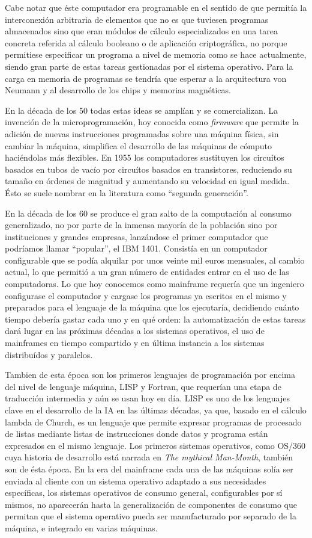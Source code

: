 \documentclass[12pt]{memoir}
\begin{document}
Cabe notar que éste computador era programable en el sentido de que permitía la interconexión arbitraria de elementos que no es que tuviesen programas almacenados sino que eran módulos de cálculo especializados en una tarea concreta referida al cálculo booleano o de aplicación criptográfica, no porque permitiese especificar un programa a nivel de memoria como se hace actualmente, siendo gran parte de estas tareas gestionadas por el sistema operativo. Para la carga en memoria de programas se tendría que esperar a la arquitectura von Neumann y al desarrollo de los chips y memorias magnéticas.

En la década de los 50 todas estas ideas se amplían y se comercializan. La invención de la microprogramación, hoy conocida como \textit{firmware} que permite la adición de nuevas instrucciones programadas sobre una máquina física, sin cambiar la máquina, simplifica el desarrollo de las máquinas de cómputo haciéndolas más flexibles. En 1955 los computadores sustituyen los circuítos basados en tubos de vacío por circuítos basados en transistores, reduciendo su tamaño en órdenes de magnitud y aumentando su velocidad en igual medida. Ésto se suele nombrar en la literatura como ``segunda generación''.

En la década de los 60 se produce el gran salto de la computación al consumo generalizado, no por parte de la inmensa mayoría de la población sino por instituciones y grandes empresas, lanzándose el primer computador que podríamos llamar ``popular'', el IBM 1401. Consistía en un computador configurable que se podía alquilar por unos veinte mil euros mensuales, al cambio actual, lo que permitió a un gran número de entidades entrar en el uso de las computadoras. Lo que hoy conocemos como mainframe requería que un ingeniero configurase el computador y cargase los programas ya escritos en el mismo y preparados para el lenguaje de la máquina que los ejecutaría, decidiendo cuánto tiempo debería gastar cada uno y en qué orden: la automatización de estas tareas dará lugar en las próximas décadas a los sistemas operativos, el uso de mainframes en tiempo compartido y en última instancia a los sistemas distribuídos y paralelos. 

Tambien de esta época son los primeros lenguajes de programación por encima del nivel de lenguaje máquina, LISP y Fortran, que requerían una etapa de traducción intermedia y aún se usan hoy en día. LISP es uno de los lenguajes clave en el desarrollo de la IA en las últimas décadas, ya que, basado en el cálculo lambda de Church, es un lenguaje que permite expresar programas de procesado de listas mediante listas de instrucciones donde datos y programa están expresados en el mismo lenguaje. Los primeros sistemas operativos, como OS/360 cuya historia de desarrollo está narrada en \textit{The mythical Man-Month}, también son de ésta época. En la era del mainframe cada una de las máquinas solía ser enviada al cliente con un sistema operativo adaptado a sus necesidades específicas, los sistemas operativos de consumo general, configurables por sí mismos, no aparecerán hasta la generalización de componentes de consumo que permitan que el sistema operativo pueda ser manufacturado por separado de la máquina, e integrado en varias máquinas.
\end{document}
